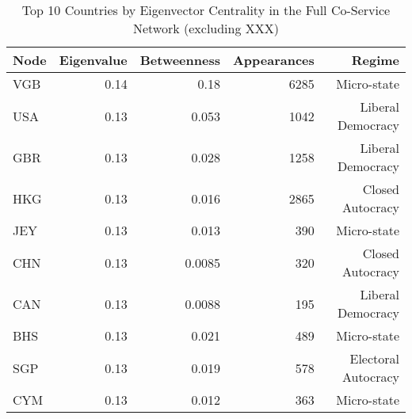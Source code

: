 \begin{table}[htbp]
\centering
\caption{Top 10 Countries by Eigenvector Centrality in the Full Co-Service Network (excluding XXX)}
\label{tab:appendix_country_eigenvector_app}
\begin{tabular}{lrrrr}
\toprule
Node & Eigenvalue & Betweenness & Appearances & Regime              \\
\midrule
VGB  & 0.14    & 0.18    & 6285        & Micro-state         \\
USA  & 0.13    & 0.053    & 1042        & Liberal Democracy   \\
GBR  & 0.13    & 0.028    & 1258        & Liberal Democracy   \\
HKG  & 0.13    & 0.016    & 2865        & Closed Autocracy    \\
JEY  & 0.13    & 0.013    & 390         & Micro-state         \\
CHN  & 0.13    & 0.0085    & 320         & Closed Autocracy    \\
CAN  & 0.13    & 0.0088    & 195         & Liberal Democracy   \\
BHS  & 0.13    & 0.021    & 489         & Micro-state         \\
SGP  & 0.13    & 0.019    & 578         & Electoral Autocracy \\
CYM  & 0.13    & 0.012    & 363         & Micro-state         \\
\bottomrule
\end{tabular}
\end{table}


